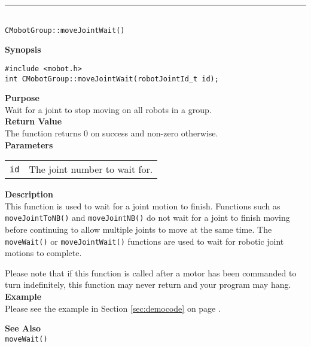 \noindent
\vspace{5pt}
\rule{4.5in}{0.015in}\\
\noindent
{\LARGE \texttt{CMobotGroup::moveJointWait()}}\\
{}

\noindent
{\bf Synopsis}
\vspace{-8pt}
\begin{verbatim}
#include <mobot.h>
int CMobotGroup::moveJointWait(robotJointId_t id);
\end{verbatim}

\noindent
{\bf Purpose}\\
Wait for a joint to stop moving on all robots in a group.\\

\noindent
{\bf Return Value}\\
The function returns 0 on success and non-zero otherwise.\\

\noindent
{\bf Parameters}
\vspace{-0.1in}
\begin{description}
\item               
\begin{tabular}{p{10 mm}p{145 mm}}
\texttt{id} & The joint number to wait for. \\
\end{tabular}
\end{description}

\noindent
{\bf Description}\\
This function is used to wait for a joint motion to finish. Functions such as
\texttt{moveJointToNB()} and \texttt{moveJointNB()} do not wait for a joint to finish
moving before continuing to allow multiple joints to move at the same time. The
\texttt{moveWait()} or \texttt{moveJointWait()} functions are used to wait for
robotic joint motions to complete.

Please note that if this function is called after a motor has been commanded to
turn indefinitely, this function may never return and your program may hang.\\

\noindent
{\bf Example}\\
Please see the example in Section \ref{sec:democode} on page \pageref{sec:democode}.\\
\noindent

\noindent
{\bf See Also}\\
\texttt{moveWait()}

